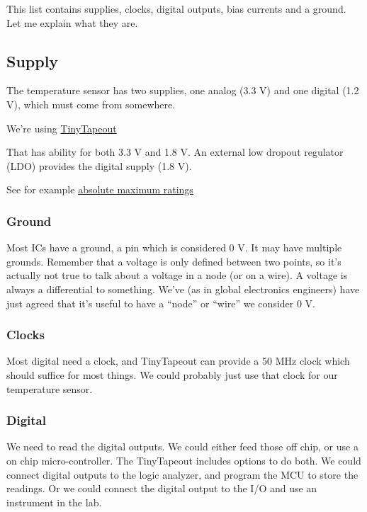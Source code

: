 This list contains supplies, clocks, digital outputs, bias currents and
a ground. Let me explain what they are.

\subsection{Supply}\label{supply}

The temperature sensor has two supplies, one analog (3.3 V) and one
digital (1.2 V), which must come from somewhere.

We're using \href{http://www.tinytapeout.com}{TinyTapeout}

That has ability for both 3.3 V and 1.8 V. An external low dropout
regulator (LDO) provides the digital supply (1.8 V).

See for example
\href{https://caravel-harness.readthedocs.io/en/latest/maximum-ratings.html}{absolute
maximum ratings}

\subsubsection{Ground}\label{ground}

Most ICs have a ground, a pin which is considered 0 V. It may have
multiple grounds. Remember that a voltage is only defined between two
points, so it's actually not true to talk about a voltage in a node (or
on a wire). A voltage is always a differential to something. We've (as
in global electronics engineers) have just agreed that it's useful to
have a ``node'' or ``wire'' we consider 0 V.

\subsubsection{Clocks}\label{clocks}

Most digital need a clock, and TinyTapeout can provide a 50 MHz clock
which should suffice for most things. We could probably just use that
clock for our temperature sensor.

\subsubsection{Digital}\label{digital}

We need to read the digital outputs. We could either feed those off
chip, or use a on chip micro-controller. The TinyTapeout includes
options to do both. We could connect digital outputs to the logic
analyzer, and program the MCU to store the readings. Or we could connect
the digital output to the I/O and use an instrument in the lab.

